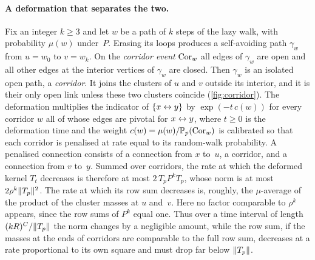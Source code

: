 \paragraph{A deformation that separates the two.}
Fix an integer $k\ge3$ and let $w$ be a path of $k$ steps of the lazy walk, with probability $\mu(w)$
under~$P$. Erasing its loops produces a self-avoiding path $\gamma_w$ from $u=w_0$ to $v=w_k$. On the
\emph{corridor event} $\mathrm{Cor}_w$ all edges of $\gamma_w$ are open and all other edges at the interior
vertices of $\gamma_w$ are closed. Then $\gamma_w$ is an isolated open path, a \emph{corridor}. It joins
the clusters of $u$ and $v$ outside its interior, and it is their only open link unless these two
clusters coincide (\cref{fig:corridor}).
The deformation multiplies the indicator of $\{x\leftrightarrow y\}$ by $\exp(-t\,c(w))$ for every corridor $w$
all of whose edges are pivotal for $x\leftrightarrow y$, where $t\ge0$ is the deformation time and the weight
$c(w)=\mu(w)/\mathbb P_p(\mathrm{Cor}_w)$ is calibrated so that each corridor is penalised at rate equal to its
random-walk probability. A penalised connection consists of a connection from $x$ to~$u$, a corridor,
and a connection from $v$ to~$y$. Summed over corridors, the rate at which the deformed kernel $T_t$
decreases is therefore at most $2\,T_pP^kT_p$, whose norm is at most $2\rho^k\lVert T_p\rVert^2$. The rate
at which its row sum decreases is, roughly, the $\mu$-average of the product of the cluster masses at
$u$ and~$v$. Here no factor comparable to $\rho^k$ appears, since the row sums of $P^k$ equal one. Thus
over a time interval of length $(kR)^{C}/\lVert T_p\rVert$ the norm changes by a negligible amount, while
the row sum, if the masses at the ends of corridors are comparable to the full row sum, decreases at a
rate proportional to its own square and must drop far below $\lVert T_p\rVert$.

